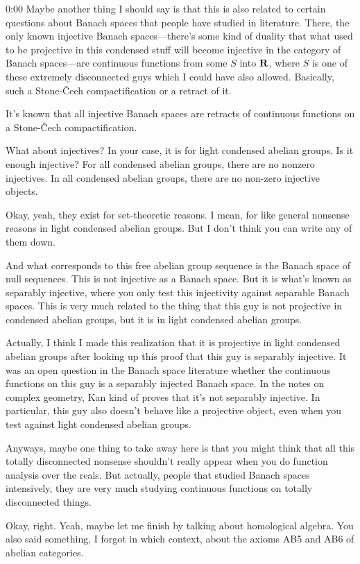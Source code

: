 \begin{unfinished}{0:00}
Maybe another thing I should say is that this is also related to certain questions about Banach spaces that people have studied in literature. There, the only known injective Banach spaces—there's some kind of duality that what used to be projective in this condensed stuff will become injective in the category of Banach spaces—are continuous functions from some $S$ into $\mathbf R$, where $S$ is one of these extremely disconnected guys which I could have also allowed. Basically, such a Stone-Čech compactification or a retract of it.

It's known that all injective Banach spaces are retracts of continuous functions on a Stone-Čech compactification.

What about injectives? In your case, it is for light condensed abelian groups. Is it enough injective? For all condensed abelian groups, there are no nonzero injectives. In all condensed abelian groups, there are no non-zero injective objects.

Okay, yeah, they exist for set-theoretic reasons. I mean, for like general nonsense reasons in light condensed abelian groups. But I don't think you can write any of them down.

And what corresponds to this free abelian group sequence is the Banach space of null sequences. This is not injective as a Banach space. But it is what's known as separably injective, where you only test this injectivity against separable Banach spaces. This is very much related to the thing that this guy is not projective in condensed abelian groups, but it is in light condensed abelian groups.

Actually, I think I made this realization that it is projective in light condensed abelian groups after looking up this proof that this guy is separably injective. It was an open question in the Banach space literature whether the continuous functions on this guy is a separably injected Banach space. In the notes on complex geometry, Kan kind of proves that it's not separably injective. In particular, this guy also doesn't behave like a projective object, even when you test against light condensed abelian groups.

Anyways, maybe one thing to take away here is that you might think that all this totally disconnected nonsense shouldn't really appear when you do function analysis over the reals. But actually, people that studied Banach spaces intensively, they are very much studying continuous functions on totally disconnected things.

Okay, right. Yeah, maybe let me finish by talking about homological algebra. You also said something, I forgot in which context, about the axioms AB5 and AB6 of abelian categories.


\end{unfinished}

